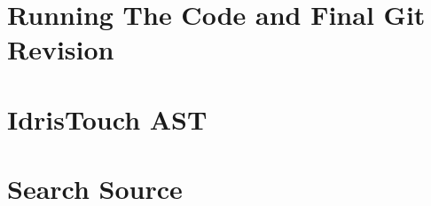 \appendix
\label{Appendix}
\chapter{Running The Code and Final Git Revision}

\chapter{IdrisTouch AST}
\label{chap:IdrisTouch_AST}



\chapter{Search Source}
\label{chap:SearchSource}
